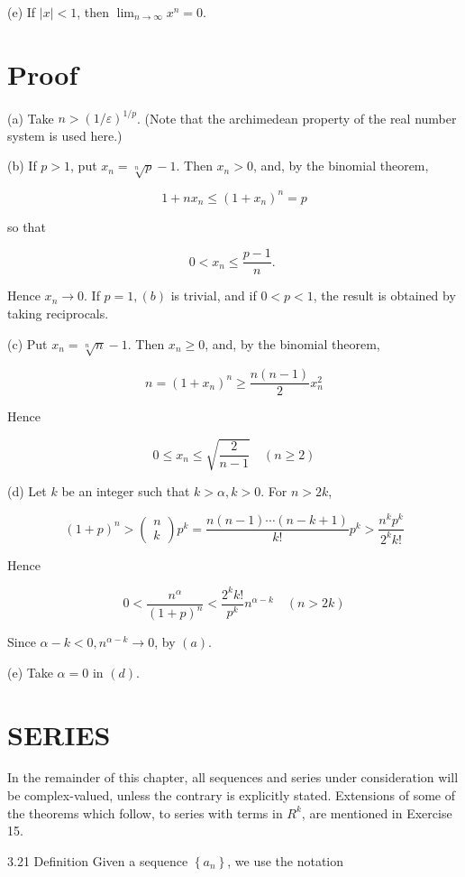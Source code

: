 \documentclass[10pt]{article}
\begin{document}
(e) If $|x|<1$, then $\lim _{n \rightarrow \infty} x^{n}=0$.

\section{Proof}
(a) Take $n>(1 / \varepsilon)^{1 / p}$. (Note that the archimedean property of the real number system is used here.)

(b) If $p>1$, put $x_{n}=\sqrt[n]{p}-1$. Then $x_{n}>0$, and, by the binomial theorem,

$$
1+n x_{n} \leq\left(1+x_{n}\right)^{n}=p
$$

so that

$$
0<x_{n} \leq \frac{p-1}{n} \text {. }
$$

Hence $x_{n} \rightarrow 0$. If $p=1,(b)$ is trivial, and if $0<p<1$, the result is obtained by taking reciprocals.

(c) Put $x_{n}=\sqrt[n]{n}-1$. Then $x_{n} \geq 0$, and, by the binomial theorem,

$$
n=\left(1+x_{n}\right)^{n} \geq \frac{n(n-1)}{2} x_{n}^{2}
$$

Hence

$$
0 \leq x_{n} \leq \sqrt{\frac{2}{n-1}} \quad(n \geq 2)
$$

(d) Let $k$ be an integer such that $k>\alpha, k>0$. For $n>2 k$,

$$
(1+p)^{n}>\left(\begin{array}{l}
n \\
k
\end{array}\right) p^{k}=\frac{n(n-1) \cdots(n-k+1)}{k !} p^{k}>\frac{n^{k} p^{k}}{2^{k} k !}
$$

Hence

$$
0<\frac{n^{\alpha}}{(1+p)^{n}}<\frac{2^{k} k !}{p^{k}} n^{\alpha-k} \quad(n>2 k)
$$

Since $\alpha-k<0, n^{\alpha-k} \rightarrow 0$, by $(a)$.

(e) Take $\alpha=0$ in $(d)$.

\section{SERIES}
In the remainder of this chapter, all sequences and series under consideration will be complex-valued, unless the contrary is explicitly stated. Extensions of some of the theorems which follow, to series with terms in $R^{k}$, are mentioned in Exercise 15.

3.21 Definition Given a sequence $\left\{a_{n}\right\}$, we use the notation
\end{document}
